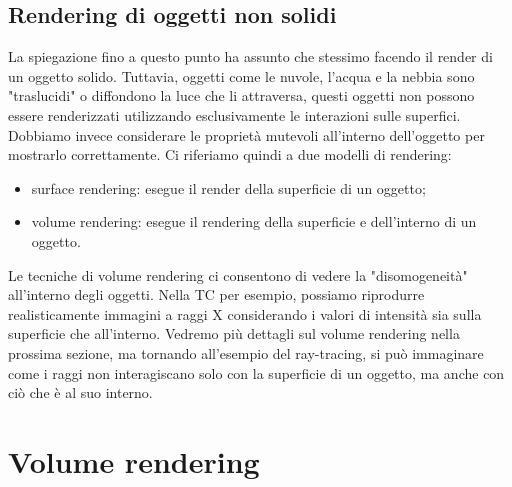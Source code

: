 \subsection{Rendering di oggetti non solidi}
La spiegazione fino a questo punto ha assunto che stessimo facendo il render di un oggetto solido. Tuttavia, oggetti come le nuvole, l'acqua e la nebbia sono "traslucidi" o diffondono la luce che li attraversa, questi oggetti non possono essere renderizzati utilizzando esclusivamente le interazioni sulle superfici. Dobbiamo invece considerare le proprietà mutevoli all'interno dell'oggetto per mostrarlo correttamente. Ci riferiamo quindi a due modelli di rendering:
\begin{itemize}
\item surface rendering: esegue il render della superficie di un oggetto;
\item volume rendering: esegue il rendering della superficie e dell'interno di un oggetto.
\end{itemize}

Le tecniche di volume rendering ci consentono di vedere la "disomogeneità" all'interno degli oggetti. Nella TC per esempio, possiamo riprodurre realisticamente immagini a raggi X considerando i valori di intensità sia sulla superficie che all'interno. Vedremo più dettagli sul volume rendering nella prossima sezione, ma tornando all'esempio del ray-tracing, si può immaginare come i raggi non interagiscano solo con la superficie di un oggetto, ma anche con ciò che è al suo interno.

\section{Volume rendering}
